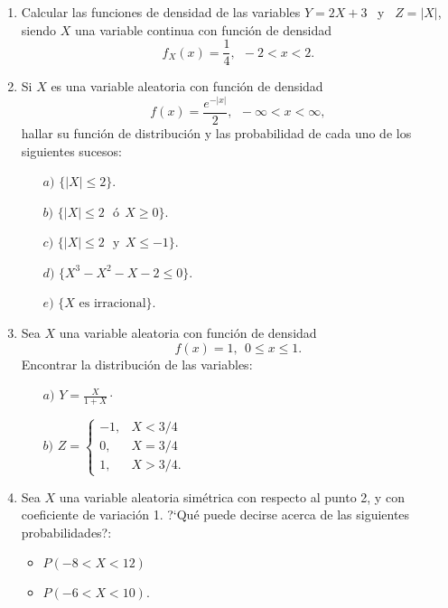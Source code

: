 \documentclass[11pt]{book}
\begin{document}
\begin{enumerate}
\vskip 0.75cm \item  Calcular las funciones de densidad de  las variables $Y=2
X + 3$ \  y \  $Z=|X |$, siendo  $X$ una variable continua  con funci{\'o}n de
densidad
     $$
     f_X(x) =  \frac{1}{4}, \ \  -2 < x < 2.
     $$


\vskip 0.75cm \item Si $X$ es una variable aleatoria con funci{\'o}n de densidad
$$f(x)=\frac{e^{-|x|}}{2}, \ \ -\infty < x < \infty,$$ hallar su funci{\'o}n de distribuci{\'o}n
y  las probabilidad de cada uno de los
      siguientes sucesos:
      \begin{enumerate}
        \item [$a)$]$\{|X|\leq 2\}$.
        \item [$b)$]$\{|X|\leq 2\ \ \ \mbox{{\'o}} \ \ X \geq 0\}.$
        \item [$c)$] $\{|X|\leq 2\ \ \ \mbox{y} \ \ X \leq -1\}.$
        \item [$d)$] $\{X^3-X^2-X-2 \leq 0 \}.$
        \item [$e)$] $\{ X \mbox{ es irracional}\}.$
      \end{enumerate}


\vskip 0.75cm \item Sea $X$ una variable aleatoria  con funci{\'o}n de densidad
$$f(x)=1, \ \ 0 \leq x \leq 1.$$ Encontrar
      la distribuci{\'o}n  de las variables:
      \begin{itemize}
\item [$a)$]  $Y=\displaystyle\frac{X}{1+X}\cdot$
\item [$b)$]  $Z=\left\{\begin{array}{ll}-1, & X<3/4\\ 0, & X=3/4\\ 1, & X>3/4.\end{array}\right.$
\end{itemize}

\vskip 0.75cm \item  Sea $X$ una variable aleatoria sim{\'e}trica con respecto al
punto 2, y con coeficiente de variaci{\'o}n 1. ?`Qu{\'e} puede decirse acerca de las
siguientes probabilidades?:
\begin{itemize}
\item $P(-8<X<12)$
\item $P(-6<X<10).$
\end{itemize}
\end{enumerate}
\end{document}
